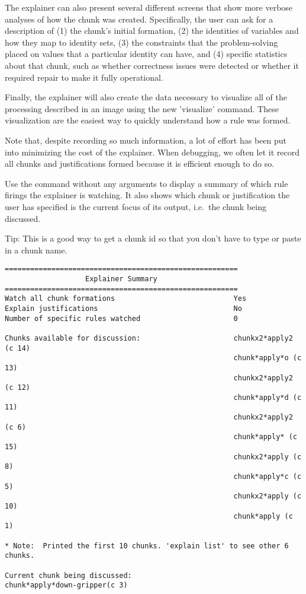 The explainer can also present several different screens that show more verbose analyses of how the chunk was created. Specifically, the user can ask for a description of (1) the chunk's initial formation, (2) the identities of variables and how they map to identity sets, (3) the constraints that the problem-solving placed on values that a particular identity can have, and (4) specific statistics about that chunk, such as whether correctness issues were detected or whether it required repair to make it fully operational.

Finally, the explainer will also create the data necessary to visualize all of the processing described in an image using the new 'visualize' command. These visualization are the easiest way to quickly understand how a rule was formed.
 
Note that, despite recording so much information, a lot of effort has been put into minimizing the cost of the explainer. When debugging, we often let it record all chunks and justifications formed because it is efficient enough to do so.

Use the  command without any arguments to display a summary of which rule firings the explainer is watching. It also shows which chunk or justification the user has specified is the current focus of its output, i.e.~the chunk being discussed.

Tip: This is a good way to get a chunk id so that you don't have to type or paste in a chunk name.

{\footnotesize
\begin{verbatim}
=======================================================
                   Explainer Summary
=======================================================
Watch all chunk formations                            Yes
Explain justifications                                No
Number of specific rules watched                      0

Chunks available for discussion:                      chunkx2*apply2 (c 14)
                                                      chunk*apply*o (c 13)
                                                      chunkx2*apply2 (c 12)
                                                      chunk*apply*d (c 11)
                                                      chunkx2*apply2 (c 6)
                                                      chunk*apply* (c 15)
                                                      chunkx2*apply (c 8)
                                                      chunk*apply*c (c 5)
                                                      chunkx2*apply (c 10)
                                                      chunk*apply (c 1)

* Note:  Printed the first 10 chunks. 'explain list' to see other 6 chunks.

Current chunk being discussed:                        chunk*apply*down-gripper(c 3)

\end{verbatim}
}

